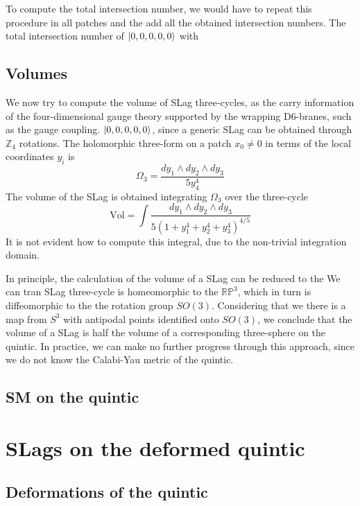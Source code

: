 To compute the total intersection number, we would have to repeat this procedure in all patches
and the add all the obtained intersection numbers.
The total intersection number of $\ket{0,0,0,0,0}$ with 

\subsection{Volumes}
We now try to compute the volume of SLag three-cycles, as the carry information of the four-dimensional
gauge theory supported by the wrapping D$6$-branes, such as the gauge coupling.
$\ket{0,0,0,0,0}$, since a generic SLag can be obtained through $\mathbb Z_4$ rotations.
The holomorphic three-form on a patch $x_0\neq0$ in terms of the local coordinates $y_i$ is
\begin{equation}
  \Omega_3=\frac{dy_1\wedge dy_2\wedge dy_3}{5y_4^4}
\end{equation}
The volume of the SLag is obtained integrating $\Omega_3$ over the three-cycle
\begin{equation}
  \mathrm{Vol}=\int \frac{dy_1\wedge dy_2\wedge dy_3}{5(1+y_1^4+y_2^4+y_3^4)^{4/5}}
\end{equation}
It is not evident how to compute this integral, due to the non-trivial integration domain.

In principle, the calculation of the volume of a SLag can be reduced to the 
We can tran
SLag three-cycle is homeomorphic to the $\mathbb{RP}^3$, which in turn is diffeomorphic to the
the rotation group $SO(3)$. 
Considering that we there is a map from $S^3$ with antipodal points identified onto $SO(3)$,
we conclude that the volume of a SLag is half the volume of a corresponding three-sphere on the quintic.
In practice, we can make no further progress through this approach, since we do not know
the Calabi-Yau metric of the quintic.



\subsection{SM on the quintic}

\section{SLags on the deformed quintic}

\subsection{Deformations of the quintic}


